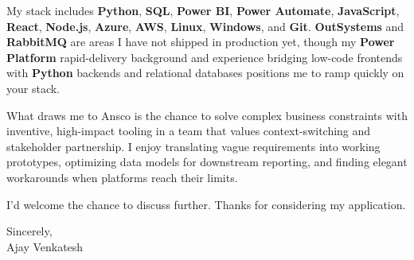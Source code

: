 \documentclass[letterpaper,11pt]{article}
\begin{document}
My stack includes \textbf{Python}, \textbf{SQL}, \textbf{Power BI}, \textbf{Power Automate}, \textbf{JavaScript}, \textbf{React}, \textbf{Node.js}, \textbf{Azure}, \textbf{AWS}, \textbf{Linux}, \textbf{Windows}, and \textbf{Git}. \textbf{OutSystems} and \textbf{RabbitMQ} are areas I have not shipped in production yet, though my \textbf{Power Platform} rapid-delivery background and experience bridging low-code frontends with \textbf{Python} backends and relational databases positions me to ramp quickly on your stack.

What draws me to Ansco is the chance to solve complex business constraints with inventive, high-impact tooling in a team that values context-switching and stakeholder partnership. I enjoy translating vague requirements into working prototypes, optimizing data models for downstream reporting, and finding elegant workarounds when platforms reach their limits.

I'd welcome the chance to discuss further. Thanks for considering my application.

\vspace{12pt}
Sincerely, \\
Ajay Venkatesh
\end{document}

